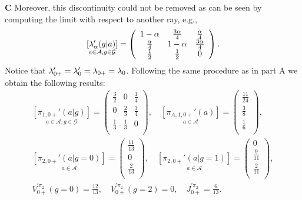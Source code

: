 \begin{example}
\vspace{1em}
\noindent{}\textbf{C}
Moreover, this discontinuity could not be removed as can be seen
by computing the limit with respect to another ray, e.g.,
$$
\underset{a\in \mathcal{A}, g \in \mathcal{G}}{[\mathit{\lambda}_{\alpha}'(g|a)]} =
\left(
\begin{array}{ccc}
1-\alpha          & \frac{3\alpha}{4} & \frac{\alpha}{4} \\
\frac{\alpha}{4} & 1-\alpha         & \frac{3\alpha}{4}  \\
\frac{1}{2}       & \frac{1}{2}      & 0 \\
\end{array}
\right)
.
$$
Notice that $\mathit{\lambda}_{0+}' = \mathit{\lambda}_{0}' = \mathit{\lambda}_{0+} = \mathit{\lambda}_{0}$. 
Following the same procedure as in part A we obtain the following results:
$$
\begin{gathered}
\underset{a\in \mathcal{A}, g \in \mathcal{G}}{[\pi_{1,0+}'(a|g)]} =
\left(
\begin{array}{ccc}
\frac{3}{2} & 0            & \frac{1}{4} \\
0           & \frac{2}{3}  & \frac{3}{4}  \\
\frac{1}{3} & \frac{1}{3}  & 0 \\
\end{array}
\right)
,\quad
\underset{a\in \mathcal{A}}{[\pi_{A,1,0+}'(a)]} =
\left(
\begin{array}{c}
\frac{11}{24} \\
\frac{3}{8} \\
\frac{1}{6}  \\
\end{array}
\right)
,
\\
\underset{a\in \mathcal{A}}{[\pi_{2,0+}'(a|g=0)]} =
\left(
\begin{array}{c}
\frac{11}{13} \\
0 \\
\frac{2}{13}  \\
\end{array}
\right)
,\quad
\underset{a\in \mathcal{A}}{[\pi_{2,0+}'(a|g=1)]} =
\left(
\begin{array}{c}
0 \\
\frac{9}{11} \\
\frac{2}{11}  \\
\end{array}
\right),
\\
V_{0+}^{'\pi_2}(g=0) = \frac{12}{13},\quad
V_{0+}^{'\pi_2}(g=2) = 0,\quad
J_{0+}^{'\pi_2} = \frac{6}{13}.
\end{gathered}
$$
\end{example}

